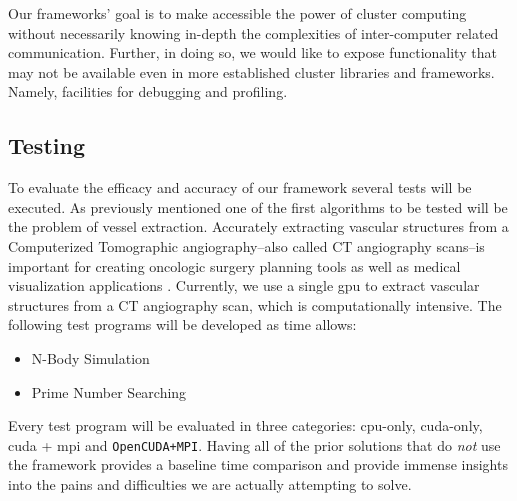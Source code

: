 Our frameworks' goal is to make accessible the power of \gls{cluster} computing
without necessarily knowing in-depth the complexities of inter-computer related
communication. Further, in doing so, we would like to expose functionality that
may not be available even in more established \gls{cluster} libraries and
frameworks. Namely, facilities for debugging and profiling.

\subsection{Testing}

To evaluate the efficacy and accuracy of our framework several tests will be
executed. As previously mentioned one of the first algorithms to be tested will
be the problem of vessel extraction. Accurately extracting vascular structures
from a Computerized Tomographic angiography--also called CT angiography
scans--is important for creating oncologic surgery planning tools as well as
medical visualization applications \cite{erdt2008automatic}.  Currently, we use
a single \gls{gpu} to extract vascular structures from a CT angiography scan,
which is computationally intensive. The following test programs will be
developed as time allows:

\begin{itemize}
    \item N-Body Simulation
    \item Prime Number Searching
\end{itemize}

Every test program will be evaluated in three categories: \gls{cpu}-only,
\gls{cuda}-only, \gls{cuda} + \gls{mpi} and \texttt{OpenCUDA+MPI}. Having all
of the prior solutions that do \emph{not} use the framework provides a baseline
time comparison and provide immense insights into the pains and difficulties we
are actually attempting to solve.
